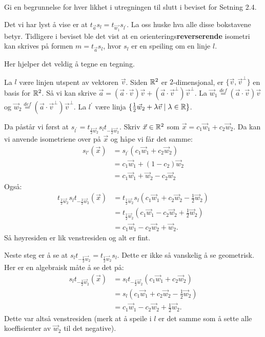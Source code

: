\documentclass[11pt, norsk]{article}
\begin{document}
\begin{oppg}
Gi en begrunnelse for hver likhet i utregningen til slutt i beviset for Setning 2.4.
\end{oppg}
\begin{losn}
Det vi har lyst å vise er at $t_{\vec a} s_l = t_{\vec{w_1}} s_{l^\prime}$. La oss huske hva alle disse bokstavene betyr. Tidligere i beviset ble det vist at en orienterings\textbf{reverserende} isometri kan skrives på formen $m=t_{\vec a} s_l$, hvor $s_l$ er en speiling om en linje $l$.

Her hjelper det veldig å tegne en tegning.

La $l$ være linjen utspent av vektoren $\vec v$. Siden $\mathbb{R}^2$ er $2$-dimensjonal, er $\{ \vec v, \vec v^\perp \}$ en basis for $\mathbb{R}^2$. Så vi kan skrive $\vec a = (\vec a \cdot \vec v) \vec v + (\vec a \cdot \vec v^\perp) \vec v^\perp$. La $\vec w_1 \stackrel{def}{=} (\vec a \cdot \vec v) \vec v$ og $\vec w_2 \stackrel{def}{=} (\vec a \cdot \vec v^\perp) \vec v^\perp$. La $l^\prime$ være linja $\{ \frac 12 \vec w_2 + \lambda \vec v \mid \lambda \in \mathbb{R}\}$. 

Da påstår vi først at $s_{l^\prime} = t_{\frac 12 \vec w_2} s_l t_{-\frac 12 \vec w_2}$. Skriv $\vec x \in \mathbb{R}^2$ som $\vec x = c_1 \vec w_1 + c_2 \vec w_2$. Da kan vi anvende isometriene over på $\vec x$ og håpe vi får det samme:
\begin{align*}
  s_{l'}(\vec x) &= s_{l^\prime}(c_1 \vec w_1 + c_2 \vec w_2) \\
&= c_1 \vec w_1 + (1-c_2) \vec w_2 \\
&= c_1 \vec w_1 + \vec w_2 -c_2 \vec w_2
\end{align*}
Også:
\begin{align*}
  t_{\frac 12 \vec w_2} s_l t_{-\frac 12 \vec w_2}(\vec x) &= t_{\frac 12 \vec w_2} s_l \left(c_1 \vec w_1+c_2 \vec w_2 -\frac 12 \vec w_2\right) \\
&= t_{\frac 12 \vec w_2} \left(c_1 \vec w_1 -c_2 \vec w_2+\frac 12 \vec w_2\right) \\
&= c_1 \vec w_1 -c_2 \vec w_2 + \vec w_2.
\end{align*}
Så høyresiden er lik venstresiden og alt er fint. 

Neste steg er å se at $s_l t_{-\frac 12 \vec w_2} = t_{\frac 12 \vec w_2} s_l$. Dette er ikke så vanskelig å se geometrisk. Her er en algebraisk måte å se det på:
\begin{align*}
  s_l t_{-\frac 12 \vec w_2}(\vec x) &=   s_l t_{-\frac 12 \vec w_2}(c_1 \vec w_1 + c_2 \vec w_2) \\
&= s_l \left(c_1 \vec w_1 + c_2 \vec w_2 - \frac 12 \vec w_2 \right)\\
&= c_1 \vec w_1 - c_2 \vec w_2 + \frac 12 \vec w_2.
\end{align*}
Dette var altså venstresiden (merk at å speile i $l$ er det samme som å sette alle koeffisienter av $\vec w_2$ til det negative).


\end{losn}
\end{document}
